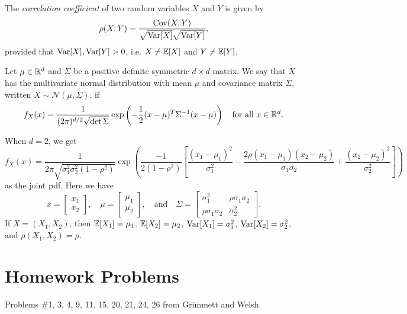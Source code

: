 \begin{definition}
  The \emph{correlation coefficient} of two random
  variables $X$ and $Y$ is given by
  \[
  \rho(X, Y) = \frac{\operatorname{Cov}(X, Y)}{\sqrt{\operatorname{Var}[X]} \sqrt{\operatorname{Var}[Y]}},
  \]
  provided that $\operatorname{Var}[X], \operatorname{Var}[Y] > 0$, i.e.
  $X \ne \mathbb{E}[X]$ and $Y \ne \mathbb{E}[Y]$.
\end{definition}

\begin{definition}
  Let $\mu \in \mathbb{R}^d$ and $\Sigma$ be a
  positive definite symmetric $d \times d$ matrix.
  We say that $X$ has the multivariate
  normal distribution with mean $\mu$ and
  covariance matrix $\Sigma$, written
  $X \sim \mathcal{N}(\mu, \Sigma)$, if
  \[
    f_X(x) = \frac{1}{(2\pi)^{d / 2} \sqrt{\det \Sigma}} \exp\left(-\frac{1}{2}(x - \mu)^T \Sigma^{-1} (x - \mu)\right)
    \quad \text{for all $x \in \mathbb{R}^d$}.
  \]
\end{definition}

\begin{remark}
  When $d = 2$, we get
  \[
    f_X(x) = \frac{1}{2\pi \sqrt{\sigma_1^2 \sigma_2^2 (1 - \rho^2)}}
    \exp\left(\frac{-1}{2(1 - \rho^2)} \left[\frac{(x_1 - \mu_1)^2}{\sigma_1^2} - \frac{2\rho(x_1 - \mu_1)(x_2 - \mu_2)}{\sigma_1 \sigma_2} + \frac{(x_2 - \mu_2)^2}{\sigma_2^2}\right]\right)
  \]
  as the joint pdf. Here we have
  \[
    x =
    \begin{bmatrix}
      x_1 \\ x_2
    \end{bmatrix}, \quad
    \mu =
    \begin{bmatrix}
      \mu_1 \\ \mu_2
    \end{bmatrix}, \quad \text{and} \quad
    \Sigma =
    \begin{bmatrix}
      \sigma_1^2 & \rho \sigma_1 \sigma_2 \\
      \rho \sigma_1 \sigma_2 & \sigma_2^2
    \end{bmatrix}.
  \]
  If $X = (X_1, X_2)$, then $\mathbb{E}[X_1] = \mu_1$,
  $\mathbb{E}[X_2] = \mu_2$, $\operatorname{Var}[X_1] = \sigma_1^2$,
  $\operatorname{Var}[X_2] = \sigma_2^2$, and $\rho(X_1, X_2) = \rho$.
\end{remark}

\section{Homework Problems}
Problems \#1, 3, 4, 9, 11, 15, 20, 21, 24, 26
from Grimmett and Welsh.
